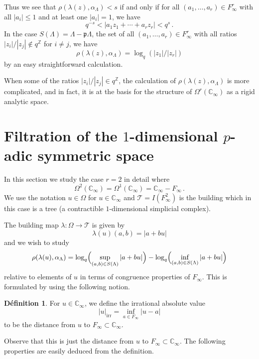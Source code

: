 \documentclass[12pt,a4paper]{article}
\theoremstyle{plain}
\theoremstyle{definition}
\newtheorem{definition}{D\'efinition}[section]
\theoremstyle{remark}
\begin{document}
Thus we see that $\rho(\lambda(z), \alpha_\Lambda) < s$ if and only if for all 
$(a_1, \ldots, a_r) \in F_\infty^r$ with all $|a_i| \leqslant 1$ and at least 
one $|a_i| = 1$, we have
\[
q^{-s} < |a_1 z_1 + \cdots + a_r z_r| < q^s \,.
\]
In the case $S(\Lambda) = \Lambda - \mathfrak{p}\Lambda$, the set of all 
$(a_1, \ldots, a_r) \in F_\infty^r$ with all ratios $|z_i|/|z_j| \notin q^\mathbb{Z}$ 
for $i \neq j$, we have
\[
\rho(\lambda(z), \alpha_\Lambda) = \log_q(|z_1|/|z_r|)
\]
by an easy straightforward calculation.

When some of the ratios $|z_i|/|z_j| \in q^\mathbb{Z}$, the calculation of 
$\rho(\lambda(z), \alpha_\Lambda)$ is more complicated, and in fact, it is 
at the basis for the structure of $\Omega^r(\mathbb{C}_\infty)$ as a rigid 
analytic space.


\section{Filtration of the $1$-dimensional $p$-adic symmetric space}

In this section we study the case $r = 2$ in detail where
\[
\Omega^2(\mathbb{C}_\infty) = \Omega^1(\mathbb{C}_\infty) = \mathbb{C}_\infty - F_\infty \,.
\]
We use the notation $u \in \Omega$ for $u \in \mathbb{C}_\infty$ and 
$\mathcal{T} = I(F_\infty^2)$ is the building which in this case is a tree (a 
contractible $1$-dimensional simplicial complex).

The building map $\lambda\colon \Omega \to \mathcal{T}$ is given by
\[
\lambda(u)(a,b) = |a + bu|
\]
and we wish to study
\[
\rho(\lambda(u), \alpha_\Lambda) = \log_q\Bigl(\sup_{(a,b) \in S(\Lambda)} |a + bu|\Bigr) - \log_q\Bigl(\inf_{(a,b) \in S(\Lambda)} |a + bu|\Bigr)
\]
relative to elements of $u$ in terms of congruence properties of $F_\infty$. 
This is formulated by using the following notion.

\begin{definition}
For $u \in \mathbb{C}_\infty$, we define the irrational absolute value
\[
|u|_{\text{irr}} = \inf_{a \in F_\infty} |u - a|
\]
to be the distance from $u$ to $F_\infty \subset \mathbb{C}_\infty$.
\end{definition}

Observe that this is just the distance from $u$ to $F_\infty \subset \mathbb{C}_\infty$. 
The following properties are easily deduced from the definition.
\end{document}
